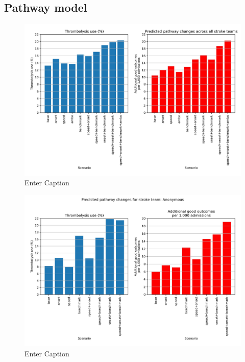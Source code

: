 \normalsize

\subsection{Pathway model}

\begin{figure}
    \centering
    \includegraphics[width=0.75\linewidth]{images/sim_results_summary}
    \caption{Enter Caption}
    \label{fig:sim_results_summary}
\end{figure}

\begin{figure}
    \centering
    \includegraphics[width=0.75\linewidth]{images/sim_results_team_x}
    \caption{Enter Caption}
    \label{fig:sim_results_team_x}
\end{figure}








